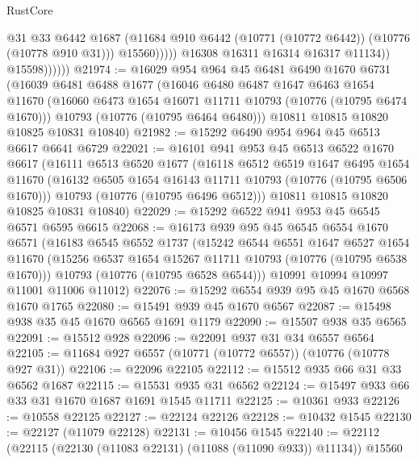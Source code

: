 \begin{lexlean}{RustCore}
\begin{coremodule}
                              @31
                              @33
                              @6442
                              @1687
                              (@11684 @910 @6442 (@10771 (@10772 @6442)) (@10776 (@10778 @910 @31)))
                              @15560)))))
                    @16308
                    @16311
                    @16314
                    @16317
                    @11134))
                @15598))))))
@21974 := @16029
    @954
    @964
    @45
    @6481
    @6490
    @1670
    @6731
    (@16039
      @6481
      @6488
      @1677
      (@16046
        @6480
        @6487
        @1647
        @6463
        @1654
        @11670
        (@16060 @6473 @1654 @16071 @11711 @10793 (@10776 (@10795 @6474 @1670)))
        @10793
        (@10776 (@10795 @6464 @6480)))
      @10811
      @10815
      @10820
      @10825
      @10831
      @10840)
@21982 := @15292 @6490 @954 @964 @45 @6513 @6617 @6641 @6729
@22021 := @16101
    @941
    @953
    @45
    @6513
    @6522
    @1670
    @6617
    (@16111
      @6513
      @6520
      @1677
      (@16118
        @6512
        @6519
        @1647
        @6495
        @1654
        @11670
        (@16132 @6505 @1654 @16143 @11711 @10793 (@10776 (@10795 @6506 @1670)))
        @10793
        (@10776 (@10795 @6496 @6512)))
      @10811
      @10815
      @10820
      @10825
      @10831
      @10840)
@22029 := @15292 @6522 @941 @953 @45 @6545 @6571 @6595 @6615
@22068 := @16173
    @939
    @95
    @45
    @6545
    @6554
    @1670
    @6571
    (@16183
      @6545
      @6552
      @1737
      (@15242
        @6544
        @6551
        @1647
        @6527
        @1654
        @11670
        (@15256 @6537 @1654 @15267 @11711 @10793 (@10776 (@10795 @6538 @1670)))
        @10793
        (@10776 (@10795 @6528 @6544)))
      @10991
      @10994
      @10997
      @11001
      @11006
      @11012)
@22076 := @15292 @6554 @939 @95 @45 @1670 @6568 @1670 @1765
@22080 := @15491 @939 @45 @1670 @6567
@22087 := @15498 @938 @35 @45 @1670 @6565 @1691 @1179
@22090 := @15507 @938 @35 @6565
@22091 := @15512 @928
@22096 := @22091 @937 @31 @34 @6557 @6564
@22105 := @11684 @927 @6557 (@10771 (@10772 @6557)) (@10776 (@10778 @927 @31))
@22106 := @22096 @22105
@22112 := @15512 @935 @66 @31 @33 @6562 @1687
@22115 := @15531 @935 @31 @6562
@22124 := @15497 @933 @66 @33 @31 @1670 @1687 @1691 @1545 @11711
@22125 := @10361 @933
@22126 := @10558 @22125
@22127 := @22124 @22126
@22128 := @10432 @1545
@22130 := @22127 (@11079 @22128)
@22131 := @10456 @1545
@22140 := @22112 (@22115 (@22130 (@11083 @22131) (@11088 (@11090 @933)) @11134)) @15560

\end{coremodule}
\end{lexlean}
